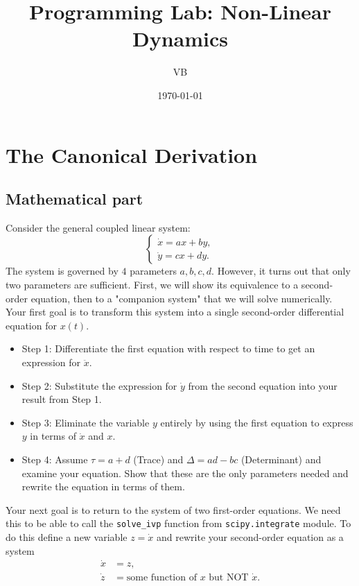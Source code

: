 \documentclass[11pt]{article}
\title{Programming Lab: Non-Linear Dynamics}
\author{VB}
\date{\today}
\begin{document}
\maketitle



\section*{The Canonical Derivation}

\subsection*{Mathematical part}

Consider the general coupled linear system:
\begin{equation}
    \begin{cases}
    \dot{x} = ax + by, \\
    \dot{y} = cx + dy.
    \end{cases}
\end{equation}
The system is governed by $4$ parameters $a,b,c,d$. However, it turns out that only two parameters are sufficient. First, we will show its equivalence to a second-order equation, then to a "companion system" that we will solve numerically. Your first goal is to transform this system into a single second-order differential equation for $x(t)$.
\begin{itemize}
    \item Step 1: Differentiate the first equation with respect to time to get an expression for $\ddot{x}$.
    \item Step 2: Substitute the expression for $\dot{y}$ from the second equation into your result from Step 1.
    \item Step 3: Eliminate the variable $y$ entirely by using the first equation to express $y$ in terms of $\dot{x}$ and $x$.
    \item Step 4: Assume $\tau = a+d$ (Trace) and $\Delta = ad - bc$ (Determinant) and examine your equation. Show that these are the only parameters needed and rewrite the equation in terms of them.
\end{itemize}


Your next goal is to return to the system of two first-order equations. We need this to be able to call the \lstinline|solve_ivp| function from \lstinline|scipy.integrate| module. To do this define a new variable $z = \dot{x}$ and rewrite your second-order equation as a system
\begin{equation*}
\begin{aligned}
 \dot{x} &= z,\\
 \dot{z} &= \text{some function of } x \text{ but NOT } \dot{x}.
\end{aligned}
\end{equation*}
\end{document}
